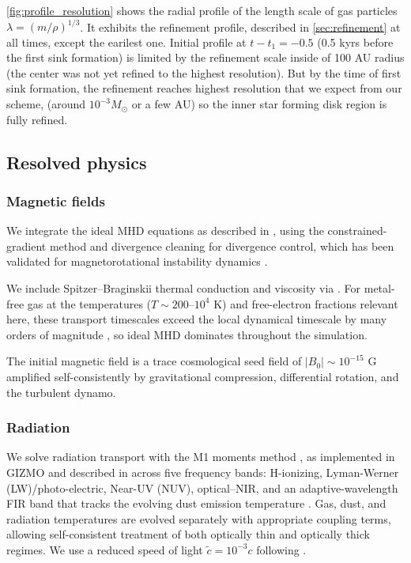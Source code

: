 \documentclass[twocolumn]{openjournal}
\begin{document}
\autoref{fig:profile_resolution} shows the radial profile of the
length scale of gas particles $\lambda = \left( m / \rho \right)^{1/3}$.
It exhibits the refinement profile, described in \autoref{sec:refinement}
at all times, except the earilest one.
Initial profile at $t-t_1=-0.5$ (0.5 kyrs before the first sink formation)
is  limited by the refinement scale inside of 100 AU radius (the center was not yet
refined to the highest resolution). But by the time of first sink
formation, the refinement reaches highest resolution that we expect from our
scheme, (around $10^{-3} M_\odot$ or a few AU) so the inner star forming disk
region is fully refined.

\subsection{Resolved physics}
\subsubsection{Magnetic fields}
\label{sec:mhd}

We integrate the ideal MHD equations as described in \citet{Hopkins_Raives_2015},
using the constrained-gradient method and divergence cleaning
\citep{Hopkins_2016_CG_MHD} for divergence control, which has been
validated for magnetorotational instability dynamics
\citep{FORGE_d_in_FIRE_Hopkin_2023}.

We include Spitzer--Braginskii thermal conduction and viscosity via
\citet{Hopkins_2017}. For metal-free gas at the temperatures
($T \sim 200$--$10^{4}$ K) and free-electron fractions relevant here,
these transport timescales exceed the local dynamical timescale by many
orders of magnitude \citep{meziani26}, so ideal MHD dominates throughout
the simulation.

The initial magnetic field is a trace cosmological seed field of
$|B_0| \sim 10^{-15}$ G
amplified self-consistently by gravitational compression,
differential rotation, and the turbulent dynamo.


\subsubsection{Radiation}
\label{sec:rad}

We solve radiation transport with the M1 moments method
\citep{Levermore_1984}, as implemented in {\small GIZMO} and described in
\citet{FORGE_d_in_FIRE_Hopkin_2023,STARFORGE_Towa_Grudic_2021, Hopkins_Grudic_2019, Hopkins2020}
across five frequency bands: H-ionizing, Lyman-Werner (LW)/photo-electric,
Near-UV (NUV), optical--NIR, and an adaptive-wavelength FIR band that tracks
the evolving dust emission temperature \citep{FIRE_3_Updated_Hopkin}.
Gas, dust, and radiation temperatures are evolved separately with
appropriate coupling terms, allowing self-consistent treatment of
both optically thin and optically thick regimes.
We use a reduced speed of light $\tilde{c} = 10^{-3} c$
following \citet{FORGE_d_in_FIRE_Hopkin_2023}.
\end{document}
